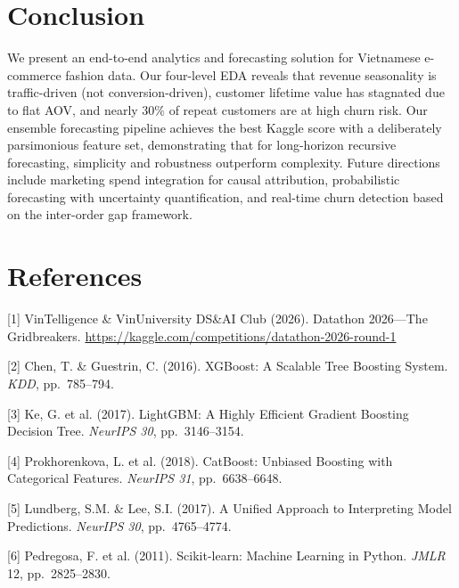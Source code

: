 \documentclass{article}
\begin{document}
\section{Conclusion}

We present an end-to-end analytics and forecasting solution for Vietnamese e-commerce fashion data. Our four-level EDA reveals that revenue seasonality is traffic-driven (not conversion-driven), customer lifetime value has stagnated due to flat AOV, and nearly 30\% of repeat customers are at high churn risk. Our ensemble forecasting pipeline achieves the best Kaggle score with a deliberately parsimonious feature set, demonstrating that for long-horizon recursive forecasting, simplicity and robustness outperform complexity. Future directions include marketing spend integration for causal attribution, probabilistic forecasting with uncertainty quantification, and real-time churn detection based on the inter-order gap framework.

\vspace{-0.1cm}
\section*{References}
\vspace{-0.1cm}

{\footnotesize
\setlength{\parskip}{1pt}

[1] VinTelligence \& VinUniversity DS\&AI Club (2026). Datathon 2026---The Gridbreakers. \url{https://kaggle.com/competitions/datathon-2026-round-1}

[2] Chen, T. \& Guestrin, C. (2016). XGBoost: A Scalable Tree Boosting System. \textit{KDD}, pp.~785--794.

[3] Ke, G. et al. (2017). LightGBM: A Highly Efficient Gradient Boosting Decision Tree. \textit{NeurIPS 30}, pp.~3146--3154.

[4] Prokhorenkova, L. et al. (2018). CatBoost: Unbiased Boosting with Categorical Features. \textit{NeurIPS 31}, pp.~6638--6648.

[5] Lundberg, S.M. \& Lee, S.I. (2017). A Unified Approach to Interpreting Model Predictions. \textit{NeurIPS 30}, pp.~4765--4774.

[6] Pedregosa, F. et al. (2011). Scikit-learn: Machine Learning in Python. \textit{JMLR} 12, pp.~2825--2830.
}
\end{document}

